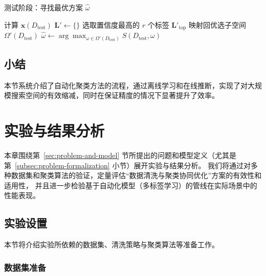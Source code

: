 \documentclass[10pt]{article} %
\numberwithin{equation}{section}
\begin{document}
\begin{algorithm}[ht]
\caption{测试阶段：寻找最优方案 \(\hat{\omega}\)}
\label{alg:test-phase}

计算 $\mathbf{x}(D_{\text{test}})$\;
$\mathbf{L}' \leftarrow \{\}$\;
选取置信度最高的 $r$ 个标签 $\mathbf{L}'_{\mathrm{top}}$\;
映射回优选子空间 $\Omega'(D_{\text{test}})$\;
$\hat{\omega} \leftarrow \arg\max_{\omega \in \Omega'(D_{\text{test}})}S(D_{\text{test}}, \omega)$\;
\KwRet{$\hat{\omega}$}
\end{algorithm}

\subsection{小结}
本节系统介绍了自动化聚类方法的流程，通过离线学习和在线推断，实现了对大规模搜索空间的有效缩减，同时在保证精度的情况下显著提升了效率。


\section{实验与结果分析}
\label{sec:chapter5}

本章围绕第~\ref{sec:problem-and-model} 节所提出的问题和模型定义（尤其是第~\ref{subsec:problem-formalization} 小节）展开实验与结果分析。
我们将通过对多种数据集和聚类算法的验证，定量评估“数据清洗与聚类协同优化”方案的有效性和适用性，
并且进一步检验基于自动化模型（多标签学习）的管线在实际场景中的性能表现。

\subsection{实验设置}
\label{sec:exp_setting}

本节将介绍实验所依赖的数据集、清洗策略与聚类算法等准备工作。

\subsubsection{数据集准备}
\label{sec:dataset_prep}
\end{document}
